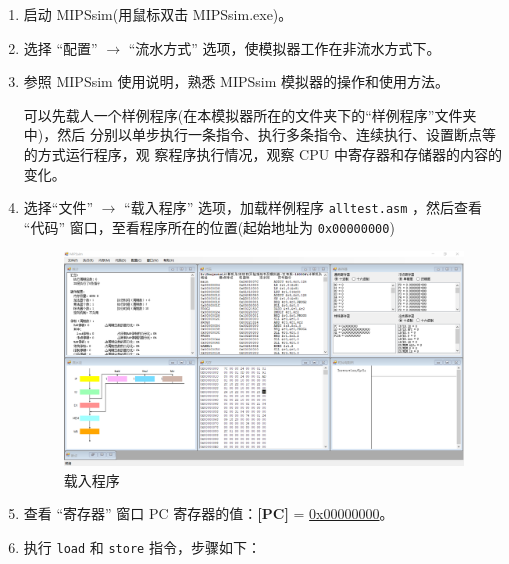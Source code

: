 \documentclass[blue,normal,cn]{elegantnote}
\newcommand{\code}[1]{\colorbox{light-gray}{\texttt{#1}}}
\begin{document}
\begin{enumerate}[wide=0pt, listparindent=2em, parsep=0pt]
    \item 启动 MIPSsim(用鼠标双击 MIPSsim.exe)。
    \item 选择 “配置” $\rightarrow$ “流水方式” 选项，使模拟器工作在非流水方式下。
    \item 参照 MIPSsim 使用说明，熟悉 MIPSsim 模拟器的操作和使用方法。

          可以先载人一个样例程序(在本模拟器所在的文件夹下的“样例程序”文件夹中)，然后
          分别以单步执行一条指令、执行多条指令、连续执行、设置断点等的方式运行程序，观
          察程序执行情况，观察 CPU 中寄存器和存储器的内容的变化。
    \item 选择“文件” $\rightarrow$ “载入程序” 选项，加载样例程序 \code{alltest.asm} ，然后查看 “代码” 窗口，至看程序所在的位置(起始地址为 \code{0x00000000})

          \begin{figure}[H]
              \centering
              \includegraphics[width=1\textwidth]{fig/load_alltest.png}
              \caption{载入程序}
              \label{fig:load_alltest}
          \end{figure}

    \item 查看 “寄存器” 窗口 PC 寄存器的值：\textbf{[PC]} = \uline{0x00000000}。
    \item 执行 \code{load} 和 \code{store} 指令，步骤如下：


\end{enumerate}
\end{document}
